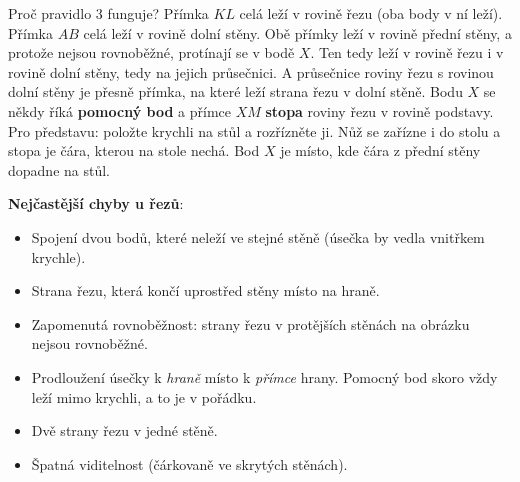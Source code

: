 \begin{example}
\begin{center}
  \end{center}
\end{example}

\begin{note}
  Proč pravidlo 3 funguje? Přímka $KL$ celá leží v rovině řezu (oba body v ní leží). Přímka $AB$ celá leží v rovině dolní stěny. Obě přímky leží v rovině přední stěny, a protože nejsou rovnoběžné, protínají se v bodě $X$. Ten tedy leží v rovině řezu i v rovině dolní stěny, tedy na jejich průsečnici. A průsečnice roviny řezu s rovinou dolní stěny je přesně přímka, na které leží strana řezu v dolní stěně. Bodu $X$ se někdy říká \textbf{pomocný bod} a přímce $XM$ \textbf{stopa} roviny řezu v rovině podstavy. Pro představu: položte krychli na stůl a rozřízněte ji. Nůž se zařízne i do stolu a stopa je čára, kterou na stole nechá. Bod $X$ je místo, kde čára z přední stěny dopadne na stůl.
\end{note}

\begin{definitionbox}
  \textbf{Nejčastější chyby u řezů}:
  \begin{itemize}
    \item Spojení dvou bodů, které neleží ve stejné stěně (úsečka by vedla vnitřkem krychle).
    \item Strana řezu, která končí uprostřed stěny místo na hraně.
    \item Zapomenutá rovnoběžnost: strany řezu v protějších stěnách na obrázku nejsou rovnoběžné.
    \item Prodloužení úsečky k \textit{hraně} místo k \textit{přímce} hrany. Pomocný bod skoro vždy leží mimo krychli, a to je v pořádku.
    \item Dvě strany řezu v jedné stěně.
    \item Špatná viditelnost (čárkovaně ve skrytých stěnách).
  \end{itemize}
\end{definitionbox}

